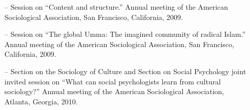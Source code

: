 \begin{itemize}[itemsep=-0.5ex]
    \item[--] Session on ``Content and structure.'' Annual meeting of the American Sociological Association, San Francisco, California, 2009.
    
    \item[--] Session on ``The global Umma: The imagined community of radical Islam.''  Annual meeting of the American Sociological Association, San Francisco, California, 2009.
    
    \item[--] Section on the Sociology of Culture and Section on Social Psychology joint invited session on ``What can social psychologists learn from cultural sociology?''   Annual meeting of the American Sociological Association, Atlanta, Georgia, 2010.
\end{itemize}